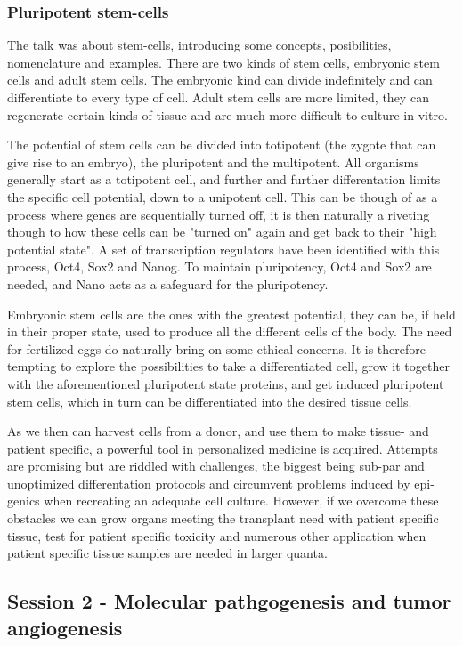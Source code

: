 \documentclass[12p]{article}
\begin{document}
\subsubsection{Pluripotent stem-cells}

The talk was about stem-cells, introducing some concepts, posibilities, nomenclature and examples.
There are two kinds of stem cells, embryonic stem cells and adult stem cells.
The embryonic kind can divide indefinitely and can differentiate to every type of cell.
Adult stem cells are more limited, they can regenerate certain kinds of tissue and are much more difficult to culture in vitro.

The potential of stem cells can be divided into totipotent (the zygote that can give rise to an embryo), the pluripotent and the multipotent.
All organisms generally start as a totipotent cell, and further and further differentation limits the specific cell potential, down to a unipotent cell.
This can be though of as a process where genes are sequentially turned off, it is then naturally a riveting though to how these cells can be "turned on" again and get back to their "high potential state".
A set of transcription regulators have been identified with this process, Oct4, Sox2 and Nanog.
To maintain pluripotency, Oct4 and Sox2 are needed, and Nano acts as a safeguard for the pluripotency.

Embryonic stem cells are the ones with the greatest potential, they can be, if held in their proper state, used to produce all the different cells of the body.
The need for fertilized eggs do naturally bring on some ethical concerns.
It is therefore tempting to explore the possibilities to take a differentiated cell, grow it together with the aforementioned pluripotent state proteins, and get induced pluripotent stem cells, which in turn can be differentiated into the desired tissue cells.

As we then can harvest cells from a donor, and use them to make tissue- and patient specific, a powerful tool in personalized medicine is acquired.
Attempts are promising but are riddled with challenges, the biggest being sub-par and unoptimized differentation protocols and circumvent problems induced by epi-genics when recreating an adequate cell culture.
However, if we overcome these obstacles we can grow organs meeting the transplant need with patient specific tissue, test for patient specific toxicity and numerous other application when patient specific tissue samples are needed in larger quanta.

\subsection*{Session 2 - Molecular pathgogenesis and tumor angiogenesis}
\end{document}
